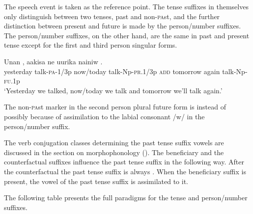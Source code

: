 The speech event is taken as the reference point. The tense suffixes in themselves only distinguish between two tenses, past and non-\textsc{pa}st, and the further distinction between present and future is made by the person/number suffixes. The person/number suffixes, on the other hand, are the same in past and present tense except for the first and third person singular forms. 

\ea%
\label{ex:3:x1029}
\gll Unan , aakisa  ne uurika nainiw .\\
yesterday talk-\textsc{pa}-1/3p now/today talk-Np-\textsc{pr}.1/3p \textsc{add} tomorrow again talk-Np-\textsc{fu}.1p\\
\glt`Yesterday we talked, now/today we talk and tomorrow we'll talk again.'
\z

The non-\textsc{pa}st marker in the second person plural future form is \textstyleEmphasizedVernacularWords{\nobreakdash-} instead of \textstyleEmphasizedVernacularWords{\nobreakdash-} possibly because of assimilation to the labial consonant /w/ in the person/number suffix. 

The verb conjugation classes determining the past tense suffix vowels are discussed in the section on morphophonology (). The beneficiary and the counterfactual suffixes influence the past tense suffix in the following way. After the counterfactual the past tense suffix is always \textstyleEmphasizedVernacularWords{\nobreakdash-}. When the beneficiary suffix is present, the vowel of the past tense suffix is assimilated to it.

The following table presents the full paradigms for the tense and person/number suffixes.


\begin{table}
\caption{Tense and person/number suffixes}
\label{tab:13}
\end{table}

